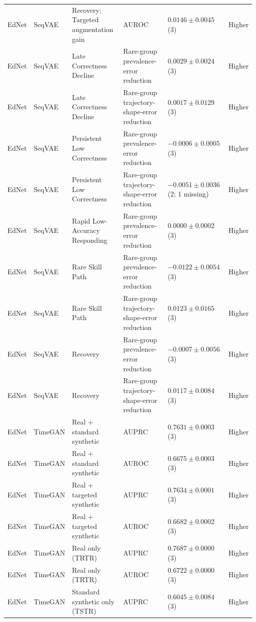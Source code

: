 \begin{longtable}{@{}p{2.25cm}p{2.05cm}p{4.7cm}p{5.0cm}p{2.6cm}p{1.25cm}@{}}
EdNet & SeqVAE & Recovery; Targeted augmentation gain & AUROC & $0.0146 \mathbin{\pm} 0.0045$ (3) & Higher \\
EdNet & SeqVAE & Late Correctness Decline & Rare-group prevalence-error reduction & $0.0029 \mathbin{\pm} 0.0024$ (3) & Higher \\
EdNet & SeqVAE & Late Correctness Decline & Rare-group trajectory-shape-error reduction & $0.0017 \mathbin{\pm} 0.0129$ (3) & Higher \\
EdNet & SeqVAE & Persistent Low Correctness & Rare-group prevalence-error reduction & $-0.0006 \mathbin{\pm} 0.0005$ (3) & Higher \\
EdNet & SeqVAE & Persistent Low Correctness & Rare-group trajectory-shape-error reduction & $-0.0051 \mathbin{\pm} 0.0036$ (2; 1 missing) & Higher \\
EdNet & SeqVAE & Rapid Low-Accuracy Responding & Rare-group prevalence-error reduction & $0.0000 \mathbin{\pm} 0.0002$ (3) & Higher \\
EdNet & SeqVAE & Rare Skill Path & Rare-group prevalence-error reduction & $-0.0122 \mathbin{\pm} 0.0054$ (3) & Higher \\
EdNet & SeqVAE & Rare Skill Path & Rare-group trajectory-shape-error reduction & $0.0123 \mathbin{\pm} 0.0165$ (3) & Higher \\
EdNet & SeqVAE & Recovery & Rare-group prevalence-error reduction & $-0.0007 \mathbin{\pm} 0.0056$ (3) & Higher \\
EdNet & SeqVAE & Recovery & Rare-group trajectory-shape-error reduction & $0.0117 \mathbin{\pm} 0.0084$ (3) & Higher \\
EdNet & TimeGAN & Real + standard synthetic & AUPRC & $0.7631 \mathbin{\pm} 0.0003$ (3) & Higher \\
EdNet & TimeGAN & Real + standard synthetic & AUROC & $0.6675 \mathbin{\pm} 0.0003$ (3) & Higher \\
EdNet & TimeGAN & Real + targeted synthetic & AUPRC & $0.7634 \mathbin{\pm} 0.0001$ (3) & Higher \\
EdNet & TimeGAN & Real + targeted synthetic & AUROC & $0.6682 \mathbin{\pm} 0.0002$ (3) & Higher \\
EdNet & TimeGAN & Real only (TRTR) & AUPRC & $0.7687 \mathbin{\pm} 0.0000$ (3) & Higher \\
EdNet & TimeGAN & Real only (TRTR) & AUROC & $0.6722 \mathbin{\pm} 0.0000$ (3) & Higher \\
EdNet & TimeGAN & Standard synthetic only (TSTR) & AUPRC & $0.6045 \mathbin{\pm} 0.0084$ (3) & Higher \\

\end{longtable}
